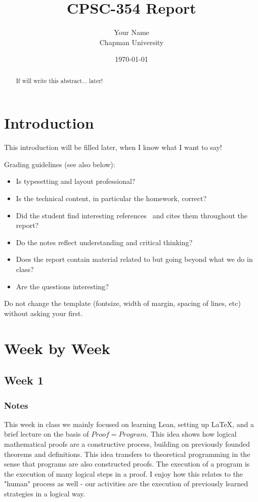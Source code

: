 \documentclass{article}
\title{CPSC-354 Report}
\author{Your Name  \\ Chapman University}
\date{\today}
\theoremstyle{theorem}
\theoremstyle{definition}
\theoremstyle{remark}
\begin{document}
\maketitle

\begin{abstract}
If will write this abstract... later!
\end{abstract}

\setcounter{tocdepth}{3}
\tableofcontents

\section{Introduction}\label{intro}

This introduction will be filled later, when I know what I want to say!

Grading  guidelines (see also below):
\begin{itemize}
\item Is typesetting and layout professional? 
\item Is the technical content, in particular the homework, correct?
\item Did the student find interesting references~\cite{bla} and cites them throughout the report?
\item Do the notes reflect understanding and critical thinking?
\item Does the report contain material related to but going beyond what we do in class?
\item Are the questions interesting?
\end{itemize}

Do not change the template (fontsize, width of margin, spacing of lines, etc) without asking your first.

\section{Week by Week}\label{homework}

\subsection{Week 1}

\subsubsection*{Notes}
This week in class we mainly focused on learning Lean, setting up \LaTeX, and a brief lecture on the basis of $Proof = Program$. This idea shows how logical mathematical proofs are a constructive process, building on previously founded theorems and definitions. This idea transfers to theoretical programming in the sense that programs are also constructed proofs. The execution of a program is the execution of many logical steps in a proof. I enjoy how this relates to the "human" process as well - our activities are the execution of previously learned strategies in a logical way.
\end{document}

